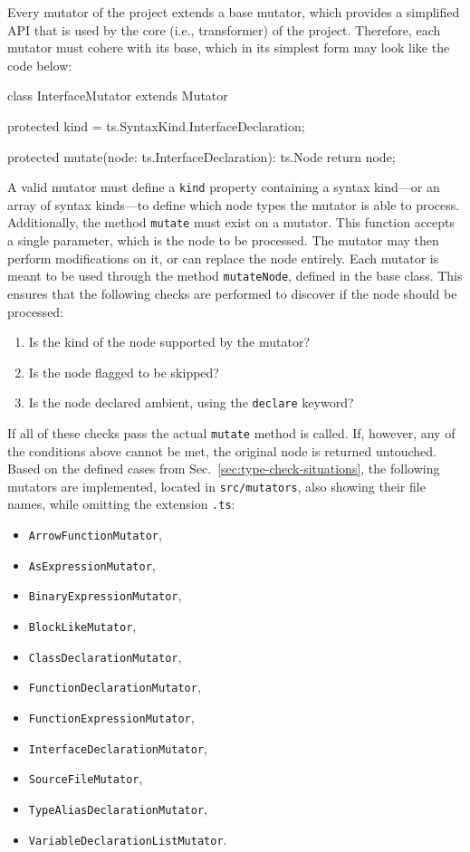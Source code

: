 Every mutator of the project extends a base mutator, which provides a simplified API that is used by the core (i.e., transformer) of the project. Therefore, each mutator must cohere with its base, which in its simplest form may look like the code below:
\begin{JsCode}[numbers=none]
class InterfaceMutator extends Mutator {

  protected kind = ts.SyntaxKind.InterfaceDeclaration;
  
  protected mutate(node: ts.InterfaceDeclaration): ts.Node {
    return node;
  }

}
\end{JsCode}
A valid mutator must define a \texttt{kind} property containing a syntax kind---or an array of syntax kinds---to define which node types the mutator is able to process. Additionally, the method \texttt{mutate} must exist on a mutator. This function accepts a single parameter, which is the node to be processed. The mutator may then perform modifications on it, or can replace the node entirely. Each mutator is meant to be used through the method \texttt{mutateNode}, defined in the base class. This ensures that the following checks are performed to discover if the node should be processed:
\begin{enumerate}
  \item Is the kind of the node supported by the mutator?
  \item Is the node flagged to be skipped?
  \item Is the node declared ambient, using the \texttt{declare} keyword?
\end{enumerate}
If all of these checks pass the actual \texttt{mutate} method is called. If, however, any of the conditions above cannot be met, the original node is returned untouched. Based on the defined cases from Sec.~\ref{sec:type-check-situations}, the following mutators are implemented, located in \texttt{src/mutators}, also showing their file names, while omitting the extension \texttt{.ts}:
\begin{itemize}
  \item \texttt{ArrowFunctionMutator},
  \item \texttt{AsExpressionMutator},
  \item \texttt{BinaryExpressionMutator},
  \item \texttt{BlockLikeMutator},
  \item \texttt{ClassDeclarationMutator},
  \item \texttt{FunctionDeclarationMutator},
  \item \texttt{FunctionExpressionMutator},
  \item \texttt{InterfaceDeclarationMutator},
  \item \texttt{SourceFileMutator},
  \item \texttt{TypeAliasDeclarationMutator},
  \item \texttt{VariableDeclarationListMutator}.
\end{itemize}
